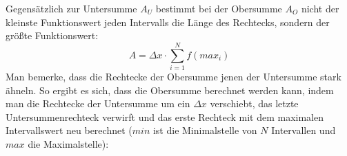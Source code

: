 \begin{figure}[h!]
\end{figure}

Gegens\"{a}tzlich zur Untersumme $A_U$ bestimmt bei der Obersumme $A_O$ nicht der kleinste Funktionswert jeden Intervalls die L\"{a}nge des Rechtecks, sondern der gr\"{o}\ss{}te Funktionswert: $$A = \Delta x \cdot \sum_{i=1}^{N} f(max_i)$$ Man bemerke, dass die Rechtecke der Obersumme jenen der Untersumme stark \"{a}hneln. So ergibt es sich, dass die Obersumme berechnet werden kann, indem man die Rechtecke der Untersumme um ein $\Delta x$ verschiebt, das letzte Untersummenrechteck verwirft und das erste Rechteck mit dem maximalen Intervallswert neu berechnet ($min$ ist die Minimalstelle von $N$ Intervallen und $max$ die Maximalstelle):

